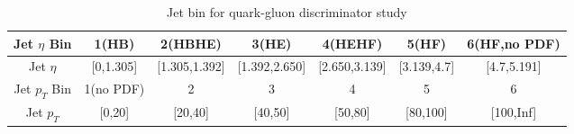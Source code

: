 \begin{table}[htbp]
\fontsize{10 pt}{1.2 em}
\selectfont
\begin{centering}
\caption{\label{tab:c4ttqgl} Jet bin for quark-gluon discriminator study}
\hspace*{-4ex}
\begin{tabular}{|c|c|c|c|c|c|c|}
\hline
Jet $\eta$ Bin  & 1(HB) & 2(HBHE) & 3(HE) & 4(HEHF) & 5(HF) & 6(HF,no PDF) \\
\hline
Jet $\eta$      & [0,1.305] & [1.305,1.392] & [1.392,2.650] & [2.650,3.139] & [3.139,4.7] & [4.7,5.191] \\
\hline
Jet $p_{T}$ Bin & 1(no PDF) & 2 & 3 & 4 & 5 & 6 \\
\hline
Jet $p_{T}$     & [0,20] & [20,40] & [40,50] & [50,80] & [80,100] & [100,Inf] \\
\hline
\end{tabular}
\par\end{centering}
\end{table}

